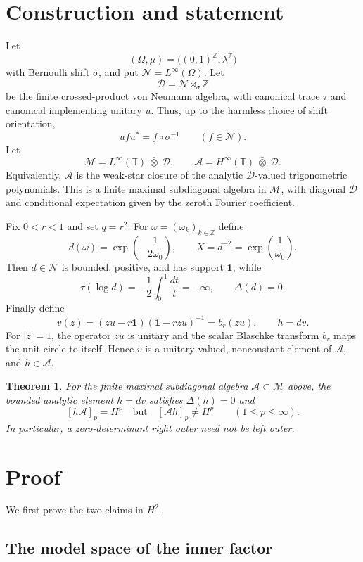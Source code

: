 \documentclass[11pt]{article}
\newtheorem{theorem}{Theorem}
\newcommand{\A}{\mathcal A}
\newcommand{\D}{\mathcal D}
\newcommand{\M}{\mathcal M}
\newcommand{\N}{\mathcal N}
\newcommand{\T}{\mathbb T}
\newcommand{\Z}{\mathbb Z}
\newcommand{\one}{\mathbf 1}
\begin{document}
\section{Construction and statement}

Let
\[
 (\Omega,\mu)=\bigl((0,1)^\Z,\lambda^\Z\bigr)
\]
with Bernoulli shift $\sigma$, and put $\N=L^\infty(\Omega)$.  Let
\[
 \D=\N\rtimes_\sigma\Z
\]
be the finite crossed-product von Neumann algebra, with canonical trace $\tau$
and canonical implementing unitary $u$.  Thus, up to the harmless choice of
shift orientation,
\[
 ufu^*=f\circ\sigma^{-1}\qquad(f\in\N).
\]
Let
\[
 \M=L^\infty(\T)\ \bar\otimes\ \D,
 \qquad
 \A=H^\infty(\T)\ \bar\otimes\ \D.
\]
Equivalently, $\A$ is the weak-star closure of the analytic $\D$-valued
trigonometric polynomials.  This is a finite maximal subdiagonal algebra in
$\M$, with diagonal $\D$ and conditional expectation given by the zeroth
Fourier coefficient.

Fix $0<r<1$ and set $q=r^2$.  For $\omega=(\omega_k)_{k\in\Z}$ define
\[
 d(\omega)=\exp\!\left(-\frac{1}{2\omega_0}\right),
 \qquad X=d^{-2}=\exp\!\left(\frac{1}{\omega_0}\right).
\]
Then $d\in\N$ is bounded, positive, and has support $\one$, while
\[
 \tau(\log d)=-\frac12\int_0^1\frac{dt}{t}=-\infty,
 \qquad \Delta(d)=0.
\]
Finally define
\[
 v(z)=(zu-r\one)(\one-rzu)^{-1}=b_r(zu),
 \qquad h=dv.
\]
For $|z|=1$, the operator $zu$ is unitary and the scalar Blaschke transform
$b_r$ maps the unit circle to itself.  Hence $v$ is a unitary-valued,
nonconstant element of $\A$, and $h\in\A$.

\begin{theorem}\label{thm:main}
For the finite maximal subdiagonal algebra $\A\subset\M$ above, the bounded
analytic element $h=dv$ satisfies $\Delta(h)=0$ and
\[
 [h\A]_p=H^p
 \quad\text{but}\quad
 [\A h]_p\neq H^p
 \qquad(1\leq p\leq\infty).
\]
In particular, a zero-determinant right outer need not be left outer.
\end{theorem}

\section{Proof}

We first prove the two claims in $H^2$.

\subsection{The model space of the inner factor}
\end{document}
